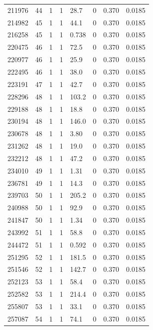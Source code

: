 \documentclass[preview]{standalone}
\begin{document}
{{{{{{{{{{{{{{{{{{\begin{tabular}{L{1.2cm}C{1.2cm} C{0.3cm}C{0.5cm} C{1.4cm}C{1.4cm} C{1.4cm}C{1.4cm}}
  211976  &    44  & 1     &  1 &  28.7  & 0  & 0.370 &  0.0185   \\ 
  214982  &    45  & 1     &  1 &  44.1  & 0  & 0.370 &  0.0185   \\ 
  216258  &    45  & 1     &  1 &  0.738  & 0  & 0.370 &  0.0185   \\ 
  220475  &    46  & 1     &  1 &  72.5  & 0  & 0.370 &  0.0185   \\ 
  220977  &    46  & 1     &  1 &  25.9  & 0  & 0.370 &  0.0185   \\ 
  222495  &    46  & 1     &  1 &  38.0  & 0  & 0.370 &  0.0185   \\ 
  223191  &    47  & 1     &  1 &  42.7  & 0  & 0.370 &  0.0185   \\ 
  228296  &    48  & 1     &  1 &  103.2  & 0  & 0.370 &  0.0185   \\ 
  229188  &    48  & 1     &  1 &  18.8  & 0  & 0.370 &  0.0185   \\ 
  230194  &    48  & 1     &  1 &  146.0  & 0  & 0.370 &  0.0185   \\ 
  230678  &    48  & 1     &  1 &  3.80  & 0  & 0.370 &  0.0185   \\ 
  231262  &    48  & 1     &  1 &  19.0  & 0  & 0.370 &  0.0185   \\ 
  232212  &    48  & 1     &  1 &  47.2  & 0  & 0.370 &  0.0185   \\ 
  234010  &    49  & 1     &  1 &  1.31  & 0  & 0.370 &  0.0185   \\ 
  236781  &    49  & 1     &  1 &  14.3  & 0  & 0.370 &  0.0185   \\ 
  239703  &    50  & 1     &  1 &  205.2  & 0  & 0.370 &  0.0185   \\ 
  240988  &    50  & 1     &  1 &  92.9  & 0  & 0.370 &  0.0185   \\ 
  241847  &    50  & 1     &  1 &  1.34  & 0  & 0.370 &  0.0185   \\ 
  243992  &    51  & 1     &  1 &  58.8  & 0  & 0.370 &  0.0185   \\ 
  244472  &    51  & 1     &  1 &  0.592  & 0  & 0.370 &  0.0185   \\ 
  251295  &    52  & 1     &  1 &  181.5  & 0  & 0.370 &  0.0185   \\ 
  251546  &    52  & 1     &  1 &  142.7  & 0  & 0.370 &  0.0185   \\ 
  252123  &    53  & 1     &  1 &  58.4  & 0  & 0.370 &  0.0185   \\ 
  252582  &    53  & 1     &  1 &  214.4  & 0  & 0.370 &  0.0185   \\ 
  255807  &    53  & 1     &  1 &  33.1  & 0  & 0.370 &  0.0185   \\ 
  257087  &    54  & 1     &  1 &  74.1  & 0  & 0.370 &  0.0185   \\ 
\hline 
\end{tabular} 

}}}}}}}}}}}}}}}}}}
\end{document}
